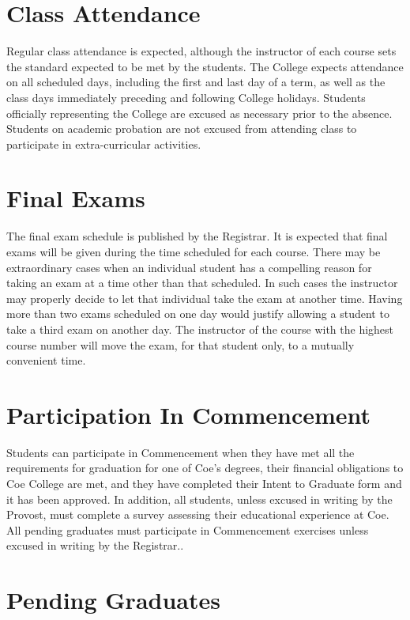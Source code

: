 \documentclass[
  letterpaper,
]{scrbook}
\begin{document}
\section{Class Attendance}\label{class-attendance}

Regular class attendance is expected, although the instructor of each
course sets the standard expected to be met by the students. The College
expects attendance on all scheduled days, including the first and last
day of a term, as well as the class days immediately preceding and
following College holidays. Students officially representing the College
are excused as necessary prior to the absence. Students on academic
probation are not excused from attending class to participate in
extra-curricular activities.

\section{Final Exams}\label{final-exams}

The final exam schedule is published by the Registrar. It is expected
that final exams will be given during the time scheduled for each
course. There may be extraordinary cases when an individual student has
a compelling reason for taking an exam at a time other than that
scheduled. In such cases the instructor may properly decide to let that
individual take the exam at another time. Having more than two exams
scheduled on one day would justify allowing a student to take a third
exam on another day. The instructor of the course with the highest
course number will move the exam, for that student only, to a mutually
convenient time.

\section{Participation In
Commencement}\label{participation-in-commencement}

Students can participate in Commencement when they have met all the
requirements for graduation for one of Coe's degrees, their financial
obligations to Coe College are met, and they have completed their Intent
to Graduate form and it has been approved. In addition, all students,
unless excused in writing by the Provost, must complete a survey
assessing their educational experience at Coe. All pending graduates
must participate in Commencement exercises unless excused in writing by
the Registrar..

\section{Pending Graduates}\label{pending-graduates}
\end{document}
